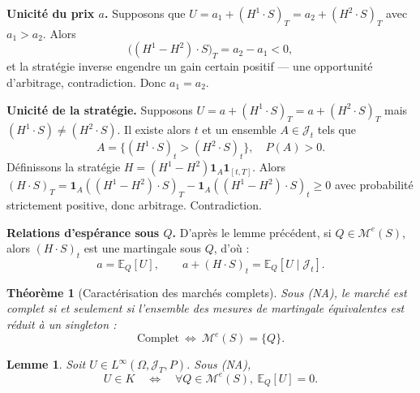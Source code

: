 \documentclass[12pt,a4paper]{article}
\makeatletter
\numberwithin{equation}{section}
\theoremstyle{plain} %
\newtheorem{theoreme}{Théorème}              %
\newtheorem{lemme}{Lemme}
\theoremstyle{definition} %
\theoremstyle{remark} %
\theoremstyle{myexample}
\theoremstyle{definition}
\renewenvironment{proof}[1][\proofname]{%
  \par\vspace{0.8em}%
  \pushQED{\qed}%
  \normalfont\color{cyan}%
  \topsep6\p@\@plus6\p@\relax
  \trivlist
  \item[\hskip\labelsep\bfseries\color{cyan}#1\@addpunct{.}]\ignorespaces
}{%
  \popQED\endtrivlist\vspace{0.8em}%
}
\newcommand{\E}{\mathbb{E}}
\newcommand{\indic}{\mathbf{1}}
\makeatother
\begin{document}
\begin{proof}[Preuve de la remarque]
\textbf{Unicité du prix $a$.}  
Supposons que $U=a_1+(H^1\cdot S)_T=a_2+(H^2\cdot S)_T$ avec $a_1>a_2$.  
Alors
\[
\big((H^1 - H^2)\cdot S\big)_T = a_2 - a_1 < 0,
\]
et la stratégie inverse engendre un gain certain positif — une opportunité d’arbitrage, contradiction.  
Donc $a_1=a_2$.

\smallskip
\textbf{Unicité de la stratégie.}  
Supposons $U=a+(H^1\cdot S)_T=a+(H^2\cdot S)_T$ mais $(H^1\cdot S)\neq(H^2\cdot S)$.  
Il existe alors $t$ et un ensemble $A\in\mathcal{J}_t$ tels que
\[
A = \{(H^1\cdot S)_t > (H^2\cdot S)_t\},\quad P(A)>0.
\]
Définissons la stratégie $H = (H^1-H^2)\indic_A \indic_{[t,T]}$.  
Alors $(H\cdot S)_T = \indic_A((H^1-H^2)\cdot S)_T - \indic_A((H^1-H^2)\cdot S)_t \ge 0$ avec probabilité strictement positive, donc arbitrage. Contradiction.

\smallskip
\textbf{Relations d’espérance sous $Q$.}  
D’après le lemme précédent, si $Q\in\mathcal{M}^e(S)$, alors $(H\cdot S)_t$ est une martingale sous $Q$, d’où :
\[
a = \E_Q[U],\qquad a + (H\cdot S)_t = \E_Q[U\mid\mathcal{J}_t].
\]
\end{proof}

\begin{theoreme}[Caractérisation des marchés complets]
\label{thm:complet_singleton}
Sous (NA), le marché est complet si et seulement si l’ensemble des mesures de martingale équivalentes est réduit à un singleton :
\[
\text{Complet} \ \Longleftrightarrow\ \mathcal{M}^e(S)=\{Q\}.
\]
\end{theoreme}

\begin{lemme}\label{lem:10}
\label{lem:UinK_iff_EQ0}
Soit $U\in L^\infty(\Omega,\mathcal{J}_T,P)$. Sous (NA),
\[
U\in K \quad \Longleftrightarrow \quad \forall Q\in\mathcal{M}^e(S),\ \E_Q[U]=0.
\]
\end{lemme}
\end{document}
